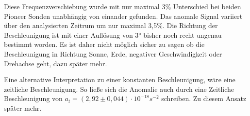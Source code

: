 Diese Frequenzverschiebung wurde mit nur maximal 3\% Unterschied bei beiden Pioneer Sonden unabhängig von einander
gefunden. Das anomale Signal variiert über den analysierten Zeitrum um nur maximal 3,5\%. Die Richtung der
Beschleunigung ist mit einer Auflösung von 3° bisher noch recht ungenau bestimmt worden. Es ist daher nicht möglich
sicher zu sagen ob die Beschleunigung
in Richtung Sonne, Erde, negativer Geschwindigkeit oder Drehachse geht, dazu später mehr.

Eine alternative Interpretation zu einer konstanten Beschleunigung, wäre eine zeitliche Beschleunigung.
So ließe sich die Anomalie auch durch eine Zeitliche Beschleunigung von $a_t = (2,92 \pm 0,044) \cdot 10^{-18} s^{-2}$ schreiben. Zu diesem Ansatz später mehr.
